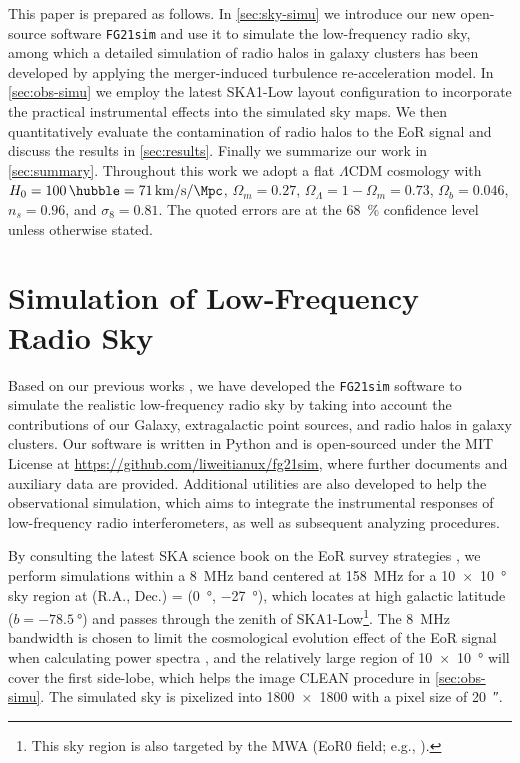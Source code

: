 \documentclass[modern]{aastex62}
\newcommand{\lcdm}{$\Lambda$CDM}
\begin{document}
This paper is prepared as follows.
In \autoref{sec:sky-simu} we introduce our new open-source software
\texttt{FG21sim} and use it to simulate the low-frequency radio sky,
among which a detailed simulation of radio halos in galaxy clusters has
been developed by applying the merger-induced turbulence re-acceleration
model.
In \autoref{sec:obs-simu} we employ the latest SKA1-Low layout
configuration to incorporate the practical instrumental effects into
the simulated sky maps.
We then quantitatively evaluate the contamination of radio halos to the
EoR signal and discuss the results in \autoref{sec:results}.
Finally we summarize our work in \autoref{sec:summary}.
Throughout this work we adopt a flat \lcdm{} cosmology with
$H_0 = \SI{100}{\hubble} = \SI{71}{\km\per\second\per\Mpc}$,
$\Omega_m = 0.27$, $\Omega_{\Lambda} = 1 - \Omega_m = 0.73$,
$\Omega_b = 0.046$, $n_s = 0.96$, and $\sigma_8 = 0.81$.
The quoted errors are at the \SI{68}{\percent} confidence level unless
otherwise stated.


\section{Simulation of Low-Frequency Radio Sky}
\label{sec:sky-simu}

Based on our previous works \citep{wang2010,wang2013}, we have developed
the \texttt{FG21sim} software to simulate the realistic low-frequency
radio sky by taking into account the contributions of our Galaxy,
extragalactic point sources, and radio halos in galaxy clusters.
Our software is written in Python and is open-sourced under the MIT License
at \url{https://github.com/liweitianux/fg21sim},
where further documents and auxiliary data are provided.
Additional utilities are also developed to help the observational simulation,
which aims to integrate the instrumental responses of low-frequency radio
interferometers, as well as subsequent analyzing procedures.

By consulting the latest SKA science book on the EoR survey strategies
\citep[e.g.,][]{koopmans2015rev}, we perform simulations within
a \SI{8}{\MHz} band centered at \SI{158}{\MHz} for a
\SI[product-units=repeat]{10 x 10}{\degree}
sky region at (R.A., Dec.) = (\SI{0}{\degree}, \SI{-27}{\degree}),
which locates at high galactic latitude ($b = \SI{-78.5}{\degree}$)
and passes through the zenith of SKA1-Low\footnote{%
  This sky region is also targeted by the MWA (EoR0 field;
  e.g., \citealt{beardsley2016}).}.
The \SI{8}{\MHz} bandwidth is chosen to limit the cosmological evolution
effect of the EoR signal when calculating power spectra
\citep[e.g.][]{wyithe2004,thyagarajan2013},
and the relatively large region of \SI[product-units=repeat]{10 x 10}{\degree}
will cover the first side-lobe, which helps the image CLEAN procedure
in \autoref{sec:obs-simu}.
The simulated sky is pixelized into \num{1800 x 1800} with a pixel size
of \SI{20}{\arcsecond}.
\end{document}
